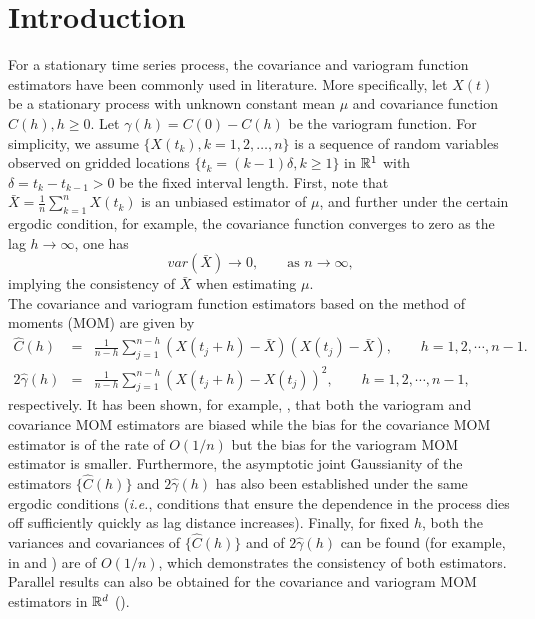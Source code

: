 %
%

\section{Introduction}

For a stationary time series process, the covariance and variogram function estimators have been commonly used in literature. More specifically, let $X(t)$ be a stationary process with unknown constant mean $\mu$ and covariance function $C(h), h \ge 0$. Let $\gamma(h) = C(0) - C(h)$ be the variogram function. For simplicity, we assume $\{X(t_k), k = 1, 2, \ldots, n\}$ is a sequence of random variables observed on gridded locations $\{t_k = (k-1)\delta, k \ge 1\}$ in $\mathbb{R}^1$ with $\delta = t_k - t_{k-1} > 0$ be the fixed interval length. First, note that $\bar{X} = \frac{1}{n}\sum_{k=1}^n X(t_k)$ is an unbiased estimator of $\mu$, and further under the certain ergodic condition, for example, the covariance function converges to zero as the lag $h \to \infty$, one has
\[
var(\bar{X}) \to 0, \quad \quad \mbox{as $n \to \infty$,}
\]
implying the consistency of $\bar{X}$ when estimating $\mu$.  \\

The covariance and variogram function estimators based on the method of moments (MOM) are given by
\begin{eqnarray*}
\hat{C}(h) &=& \frac{1}{n-h}\sum_{j = 1}^{n-h}(X(t_j+h) - \bar{X})(X(t_j) - \bar{X}), \quad \quad h = 1, 2, \cdots, n-1.  \\
2\hat{\gamma}(h) &=& \frac{1}{n-h}\sum_{j = 1}^{n-h}(X(t_j+h) - X(t_j))^2, \quad \quad h = 1, 2, \cdots, n-1,
\end{eqnarray*}
respectively. It has been shown, for example, \cite{Cressie1993}, that both the variogram and covariance MOM estimators are biased while the bias for the covariance MOM estimator is of the rate of $O(1/n)$ but the bias for the variogram MOM estimator is smaller. Furthermore, the asymptotic joint Gaussianity of the estimators $\{\hat{C}(h)\}$ and $2\hat{\gamma}(h)$ has also been established under the same ergodic conditions ({\em i.e.}, conditions that ensure the dependence in the process dies off sufficiently quickly as lag distance increases). Finally, for fixed $h$, both the variances and covariances of $\{\hat{C}(h)\}$ and of $2\hat{\gamma}(h)$ can be found (for example, in \cite{fuller2009introduction} and \cite{cressie1985fitting}) are of $O(1/n)$, which demonstrates the consistency of both estimators. Parallel results can also be obtained for the covariance and variogram MOM estimators in $\mathbb{R}^d$ (\cite{Cressie1993}). 


